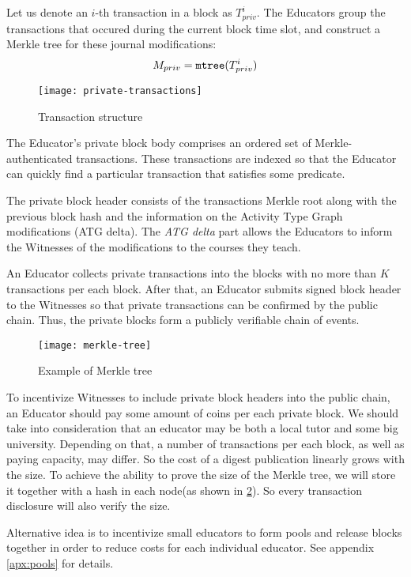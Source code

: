 Let us denote an $i$-th transaction in a block as $T_{priv}^i$. The Educators group the transactions that occured during the current block time slot, and construct a Merkle tree \cite{merkle1989certified} for these journal modifications:
\begin{equation}
M_{priv} = \mathtt{mtree}(T_{priv}^i)
\end{equation}

\begin{figure}[ht]
\centering
\texttt{[image: private-transactions]}
\caption{Transaction structure}
\label{fig:private-transactions}
\end{figure}



The Educator's private block body comprises an ordered set of Merkle-authenticated transactions. These transactions are indexed so that the Educator can quickly find a particular transaction that satisfies some predicate.

The private block header consists of the transactions Merkle root along with the
previous block hash and the information on the Activity Type Graph modifications
(ATG delta). The \textit{ATG delta} part allows the Educators to inform the
Witnesses of the modifications to the courses they teach.

An Educator collects private transactions into the blocks with no more than $K$ transactions per each block. After that, an Educator submits signed block header to the Witnesses so that private transactions can be confirmed by the public chain. Thus, the private blocks form a publicly verifiable chain of events.


\begin{figure}[ht]
\centering
\texttt{[image: merkle-tree]}
\caption{Example of Merkle tree}
\label{fig:merkle-tree}
\end{figure}

To incentivize Witnesses to include private block headers into the public chain,
an Educator should pay some amount of coins per each private block. We should
take into consideration that an educator may be both a local tutor and some big
university. Depending on that, a number of transactions per each block, as well
as paying capacity, may differ. So the cost of a digest publication linearly
grows with the size. To achieve the ability to prove the size of the Merkle
tree, we will store it together with a hash in each node(as shown in
\ref{fig:merkle-tree}). So every transaction disclosure will also verify the
size.

Alternative idea is to incentivize small educators to form pools and release
blocks together in order to reduce costs for each individual educator. See
appendix \ref{apx:pools} for details.
